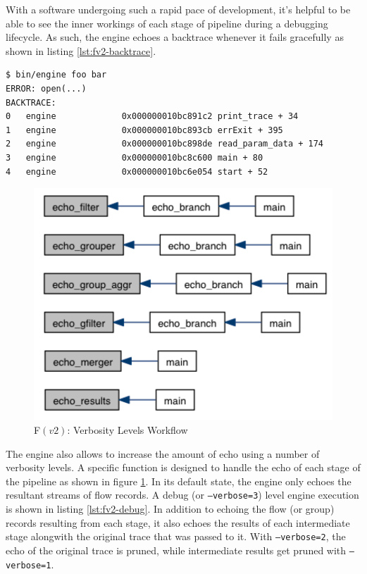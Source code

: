 With a software undergoing such a rapid pace of development, it's helpful to
be  able to see  the inner workings of
each stage of pipeline during a debugging lifecycle. As such, the engine
echoes a backtrace whenever it fails gracefully as shown in listing
\ref{lst:fv2-backtrace}.

\begin{lstlisting}
$ bin/engine foo bar
ERROR: open(...)
BACKTRACE:
0   engine             0x000000010bc891c2 print_trace + 34
1   engine             0x000000010bc893cb errExit + 395
2   engine             0x000000010bc898de read_param_data + 174
3   engine             0x000000010bc8c600 main + 80
4   engine             0x000000010bc6e054 start + 52
\end{lstlisting}

\begin{figure}[h!]
  \begin{center}
    \includegraphics* [width=0.6\linewidth]{figures/engine-verbosity}
    \caption{F$(v2)$: Verbosity Levels Workflow}
    \label{fig:engine-verbosity}
  \end{center}
\end{figure}

The engine also allows to increase the amount of echo using a number of
verbosity levels. A specific function is designed to handle the echo of each
stage of the pipeline as shown in figure \ref{fig:engine-verbosity}.  In its
default state, the engine only echoes the resultant streams  of flow records.  A debug (or \texttt{--verbose=3})
level engine execution is shown in listing \ref{lst:fv2-debug}. In addition to
echoing the flow (or group) records resulting from each stage, it also echoes
the results of each intermediate stage alongwith the original trace that was
passed to it. With \texttt{--verbose=2}, the echo of the original trace is
pruned, while intermediate results get pruned with \texttt{--verbose=1}.

